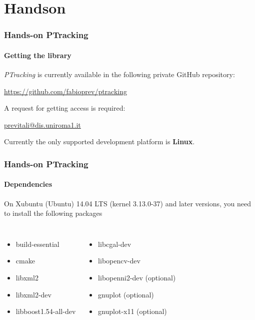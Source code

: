 \section{Handson}

\begin{frame}
	\frametitle{Hands-on PTracking}
	\framesubtitle{Getting the library}
	
	\emph{PTracking} is currently available in the following private GitHub repository:
	\begin{center}
		\url{https://github.com/fabioprev/ptracking}
	\end{center}
	
	A request for getting access is required:
	\begin{center}
		\url{previtali@dis.uniroma1.it}
	\end{center}
	
	Currently the only supported development platform is \textbf{Linux}.
\end{frame}

\begin{frame}
	\frametitle{Hands-on PTracking}
	\framesubtitle{Dependencies}
	
	On Xubuntu (Ubuntu) 14.04 LTS (kernel 3.13.0-37) and later versions, you need to install
	the following packages
	
	\vspace{0.2cm}
	
	\begin{columns}[T]
		
		\begin{itemize}
			\item build-essential
			\item cmake
			\item libxml2
			\item libxml2-dev
			\item libboost1.54-all-dev
		\end{itemize}
		
		\centering
		
		\begin{itemize}
			\item libcgal-dev
			\item libopencv-dev
			\item libopenni2-dev (optional)
			\item gnuplot (optional)
			\item gnuplot-x11 (optional)
		\end{itemize}
	\end{columns}
\end{frame}

